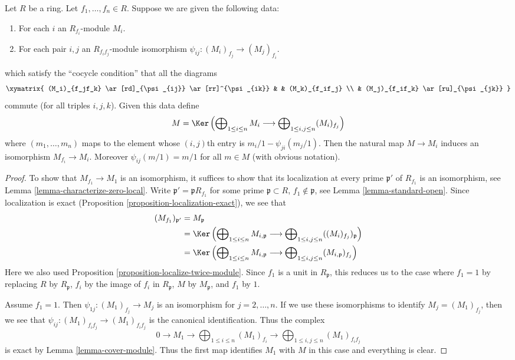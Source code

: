 \begin{lemma}
\label{lemma-glue-modules}
Let $R$ be a ring. Let $f_1, \ldots, f_n \in R$. Suppose we are given
the following data:
\begin{enumerate}
\item For each $i$ an $R_{f_i}$-module $M_i$.
\item For each pair $i, j$ an $R_{f_if_j}$-module isomorphism
$\psi_{ij} : (M_i)_{f_j} \to (M_j)_{f_i}$.
\end{enumerate}
which satisfy the ``cocycle condition'' that all the diagrams
$$
\xymatrix{
(M_i)_{f_jf_k}
\ar[rd]_{\psi_{ij}}
\ar[rr]^{\psi_{ik}}
& &
(M_k)_{f_if_j} \\
&
(M_j)_{f_if_k} \ar[ru]_{\psi_{jk}}
}
$$
commute (for all triples $i, j, k$). Given this data define
$$
M = \Ker\left(
\bigoplus\nolimits_{1 \leq i \leq n} M_i
\longrightarrow
\bigoplus\nolimits_{1 \leq i, j \leq n} (M_i)_{f_j}
\right)
$$
where $(m_1, \ldots, m_n)$ maps to the element whose
$(i, j)$th entry is $m_i/1 - \psi_{ji}(m_j/1)$.
Then the natural map $M \to M_i$ induces an isomorphism
$M_{f_i} \to M_i$. Moreover $\psi_{ij}(m/1) = m/1$
for all $m \in M$ (with obvious notation).
\end{lemma}

\begin{proof}
To show that $M_{f_1} \to M_1$ is an isomorphism, it suffices
to show that its localization at every prime $\mathfrak p'$
of $R_{f_1}$ is an isomorphism, see
Lemma \ref{lemma-characterize-zero-local}.
Write $\mathfrak p' = \mathfrak p R_{f_1}$
for some prime $\mathfrak p \subset R$, $f_1 \not \in \mathfrak p$, see
Lemma \ref{lemma-standard-open}.
Since localization is exact
(Proposition \ref{proposition-localization-exact}),
we see that
\begin{align*}
(M_{f_1})_{\mathfrak p'} & =
M_\mathfrak p \\
& =
\Ker\left(
\bigoplus\nolimits_{1 \leq i \leq n} M_{i, \mathfrak p}
\longrightarrow
\bigoplus\nolimits_{1 \leq i, j \leq n} ((M_i)_{f_j})_\mathfrak p
\right) \\
& =
\Ker\left(
\bigoplus\nolimits_{1 \leq i \leq n} M_{i, \mathfrak p}
\longrightarrow
\bigoplus\nolimits_{1 \leq i, j \leq n} (M_{i, \mathfrak p})_{f_j}
\right)
\end{align*}
Here we also used Proposition \ref{proposition-localize-twice-module}.
Since $f_1$ is a unit in $R_\mathfrak p$, this reduces us to the case
where $f_1 = 1$ by replacing $R$ by $R_\mathfrak p$, $f_i$ by the
image of $f_i$ in $R_\mathfrak p$, $M$ by $M_\mathfrak p$, and
$f_1$ by $1$.

\medskip\noindent
Assume $f_1 = 1$. Then $\psi_{1j} : (M_1)_{f_j} \to M_j$
is an isomorphism for $j = 2, \ldots, n$. If we use these
isomorphisms to identify $M_j = (M_1)_{f_j}$, then we see
that $\psi_{ij} : (M_1)_{f_if_j} \to (M_1)_{f_if_j}$ is
the canonical identification. Thus the complex
$$
0 \to M_1 \to
\bigoplus\nolimits_{1 \leq i \leq n} (M_1)_{f_i}
\longrightarrow
\bigoplus\nolimits_{1 \leq i, j \leq n}
(M_1)_{f_if_j}
$$
is exact by Lemma \ref{lemma-cover-module}.
Thus the first map identifies $M_1$ with $M$ in this case
and everything is clear.
\end{proof}